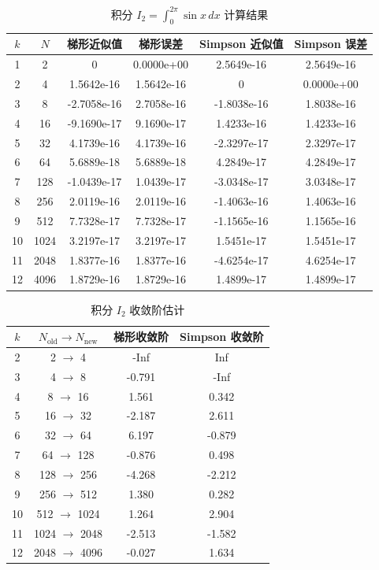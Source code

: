 \documentclass[12pt,a4paper]{article}
\begin{document}
\begin{table}[htbp]
\centering
\caption{积分 \(I_2 = \int_0^{2\pi} \sin x\,dx\) 计算结果}
\label{tab:I2}
\begin{tabular}{c c c c c c}
\toprule
\(k\) & \(N\) & 梯形近似值 & 梯形误差 & Simpson 近似值 & Simpson 误差 \\
\midrule
1 & 2 & 0 & 0.0000e+00 & 2.5649e-16 & 2.5649e-16 \\
2 & 4 & 1.5642e-16 & 1.5642e-16 & 0 & 0.0000e+00 \\
3 & 8 & -2.7058e-16 & 2.7058e-16 & -1.8038e-16 & 1.8038e-16 \\
4 & 16 & -9.1690e-17 & 9.1690e-17 & 1.4233e-16 & 1.4233e-16 \\
5 & 32 & 4.1739e-16 & 4.1739e-16 & -2.3297e-17 & 2.3297e-17 \\
6 & 64 & 5.6889e-18 & 5.6889e-18 & 4.2849e-17 & 4.2849e-17 \\
7 & 128 & -1.0439e-17 & 1.0439e-17 & -3.0348e-17 & 3.0348e-17 \\
8 & 256 & 2.0119e-16 & 2.0119e-16 & -1.4063e-16 & 1.4063e-16 \\
9 & 512 & 7.7328e-17 & 7.7328e-17 & -1.1565e-16 & 1.1565e-16 \\
10 & 1024 & 3.2197e-17 & 3.2197e-17 & 1.5451e-17 & 1.5451e-17 \\
11 & 2048 & 1.8377e-16 & 1.8377e-16 & -4.6254e-17 & 4.6254e-17 \\
12 & 4096 & 1.8729e-16 & 1.8729e-16 & 1.4899e-17 & 1.4899e-17 \\
\bottomrule
\end{tabular}
\end{table}

\begin{table}[htbp]
\centering
\caption{积分 \(I_2\) 收敛阶估计}
\label{tab:I2_order}
\begin{tabular}{c c c c}
\toprule
\(k\) & \(N_{\text{old}}\to N_{\text{new}}\) & 梯形收敛阶 & Simpson 收敛阶 \\
\midrule
2 & 2 \(\to\) 4 & -Inf & Inf \\
3 & 4 \(\to\) 8 & -0.791 & -Inf \\
4 & 8 \(\to\) 16 & 1.561 & 0.342 \\
5 & 16 \(\to\) 32 & -2.187 & 2.611 \\
6 & 32 \(\to\) 64 & 6.197 & -0.879 \\
7 & 64 \(\to\) 128 & -0.876 & 0.498 \\
8 & 128 \(\to\) 256 & -4.268 & -2.212 \\
9 & 256 \(\to\) 512 & 1.380 & 0.282 \\
10 & 512 \(\to\) 1024 & 1.264 & 2.904 \\
11 & 1024 \(\to\) 2048 & -2.513 & -1.582 \\
12 & 2048 \(\to\) 4096 & -0.027 & 1.634 \\
\bottomrule
\end{tabular}
\end{table}
\end{document}
